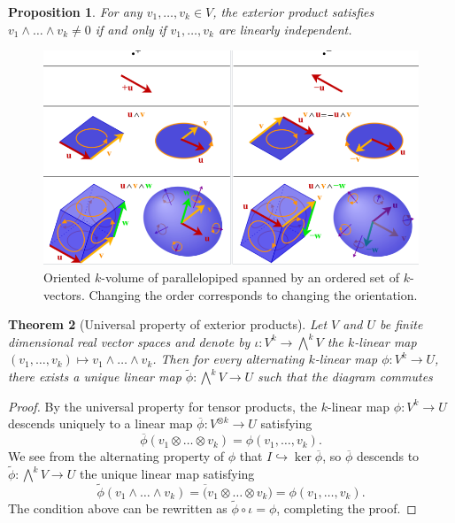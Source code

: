 \documentclass[reqno]{amsart}
\newtheorem{theorem}{Theorem}
\newtheorem{proposition}[theorem]{Proposition}
\theoremstyle{definition}
\theoremstyle{remark}
\begin{document}
\begin{proposition}
	For any $v_1, \dots, v_k \in V$, the exterior product satisfies $v_1 \wedge \dots \wedge v_k \neq 0$ if and only if $v_1, \dots, v_k$ are linearly independent. 
\end{proposition}

\begin{figure}[h]
	\begin{center}
		\includegraphics[scale =0.8]{wedge}
		\caption{Oriented $k$-volume of parallelopiped spanned by an ordered set of $k$-vectors. Changing the order corresponds to changing the orientation.}
	\end{center}
\end{figure}


\begin{theorem}[Universal property of exterior products]
	Let $V$ and $U$ be finite dimensional real vector spaces and denote by $\iota : V^k \to \bigwedge^k V$ the $k$-linear map $(v_1, \dots, v_k) \mapsto v_1 \wedge \dots \wedge v_k$. Then for every alternating $k$-linear map $\phi :V^k \to U$, there exists a unique linear map $\widetilde \phi : \bigwedge^k V \to U$ such that the diagram commutes
	\begin{center}
	\end{center}
\end{theorem}

\begin{proof}
	By the universal property for tensor products, the $k$-linear map $\phi : V^k \to U$ descends uniquely to a linear map $\overline \phi : V^{\otimes k} \to U$ satisfying 
		\[ \overline \phi (v_1 \otimes \dots \otimes v_k) = \phi(v_1, \dots, v_k). \]
	We see from the alternating property of $\phi$ that $I \hookrightarrow  \ker \overline \phi$, so $\overline \phi$ descends to $\widetilde \phi : \bigwedge^k V \to U$ the unique linear map satisfying 
		\[ \widetilde \phi (v_1 \wedge \dots \wedge v_k) = \overline (v_1 \otimes \dots \otimes v_k) = \phi(v_1, \dots, v_k). \]
	The condition above can be rewritten as $\widetilde \phi \circ \iota = \phi$, completing the proof. 		
\end{proof}
\end{document}
